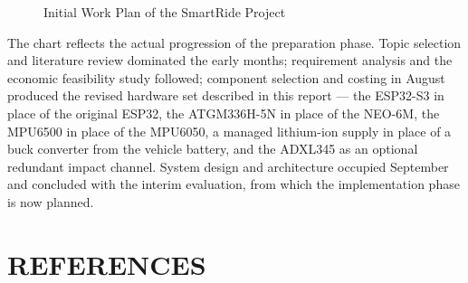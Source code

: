 \documentclass[12pt,a4paper,oneside]{report}
\begin{document}
\begin{figure}[htbp]
\centering
{}
\caption{Initial Work Plan of the SmartRide Project}
\end{figure}

The chart reflects the actual progression of the preparation phase. Topic selection and
literature review dominated the early months; requirement analysis and the economic
feasibility study followed; component selection and costing in August produced the revised
hardware set described in this report --- the ESP32-S3 in place of the original ESP32, the
ATGM336H-5N in place of the NEO-6M, the MPU6500 in place of the MPU6050, a managed
lithium-ion supply in place of a buck converter from the vehicle battery, and the ADXL345 as
an optional redundant impact channel. System design and architecture occupied September and
concluded with the interim evaluation, from which the implementation phase is now planned.

\chapter{REFERENCES}
\end{document}
